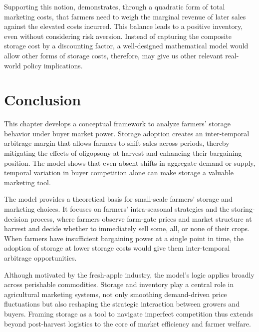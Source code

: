 Supporting this notion, \cite{williams1989economic} demonstrates, through a quadratic form of total marketing costs, that farmers need to weigh the marginal revenue of later sales against the elevated costs incurred. This balance leads to a positive inventory, even without considering risk aversion. Instead of capturing the composite storage cost by a discounting factor, a well-designed mathematical model would allow other forms of storage costs, therefore, may give us other relevant real-world policy implications.


\section{Conclusion}
\noindent This chapter develops a conceptual framework to analyze farmers' storage behavior under buyer market power. Storage adoption creates an inter-temporal arbitrage margin that allows farmers to shift sales across periods, thereby mitigating the effects of oligopsony at harvest and enhancing their bargaining position. The model shows that even absent shifts in aggregate demand or supply, temporal variation in buyer competition alone can make storage a valuable marketing tool.

The model provides a theoretical basis for small-scale farmers' storage and marketing choices. It focuses on farmers' intra-seasonal strategies and the storing-decision process, where farmers observe farm-gate prices and market structure at harvest and decide whether to immediately sell some, all, or none of their crops. When farmers have insufficient bargaining power at a single point in time, the adoption of storage at lower storage costs would give them inter-temporal arbitrage opportunities.

Although motivated by the fresh-apple industry, the model's logic applies broadly across perishable commodities. Storage and inventory play a central role in agricultural marketing systems, not only smoothing demand-driven price fluctuations but also reshaping the strategic interaction between growers and buyers. Framing storage as a tool to navigate imperfect competition thus extends beyond post-harvest logistics to the core of market efficiency and farmer welfare.

